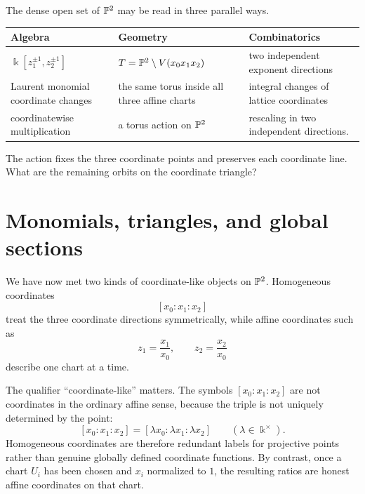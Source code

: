 \begin{threedictionaries}
The dense open set of \(\mathbb{P}^2\) may be read in three parallel ways.
\begin{center}
\small
\begin{tabularx}{\linewidth}{
  >{\centering\arraybackslash}X|
  >{\centering\arraybackslash}X|
  >{\centering\arraybackslash}X}
\textbf{Algebra} & \textbf{Geometry} & \textbf{Combinatorics}\\
\hline
\(\Bbbk[z_1^{\pm1},z_2^{\pm1}]\) &
\(T=\mathbb{P}^2\setminus V(x_0x_1x_2)\) &
two independent exponent directions
\\[2mm]
Laurent monomial coordinate changes &
the same torus inside all three affine charts &
integral changes of lattice coordinates
\\[2mm]
coordinatewise multiplication &
a torus action on \(\mathbb{P}^2\) &
rescaling in two independent directions.
\end{tabularx}
\end{center}
\end{threedictionaries}

\begin{guidingquestion}
The action fixes the three coordinate points and preserves each
coordinate line. What are the remaining orbits on the coordinate
triangle?
\end{guidingquestion}


\section{Monomials, triangles, and global sections}
\label{sec:p2-characters-sections}

We have now met two kinds of coordinate-like objects on \(\mathbb{P}^2\).
Homogeneous coordinates
\[
[x_0:x_1:x_2]
\]
treat the three coordinate directions symmetrically, while affine
coordinates such as
\[
z_1=\frac{x_1}{x_0},
\qquad
z_2=\frac{x_2}{x_0}
\]
describe one chart at a time.

The qualifier ``coordinate-like'' matters. The symbols
\([x_0:x_1:x_2]\) are not coordinates in the ordinary affine sense,
because the triple is not uniquely determined by the point:
\[
[x_0:x_1:x_2]
=
[\lambda x_0:\lambda x_1:\lambda x_2]
\qquad
(\lambda\in\Bbbk^\times).
\]
Homogeneous coordinates are therefore redundant labels for projective
points rather than genuine globally defined coordinate functions. By
contrast, once a chart \(U_i\) has been chosen and \(x_i\) normalized
to \(1\), the resulting ratios are honest affine coordinates on that
chart.

